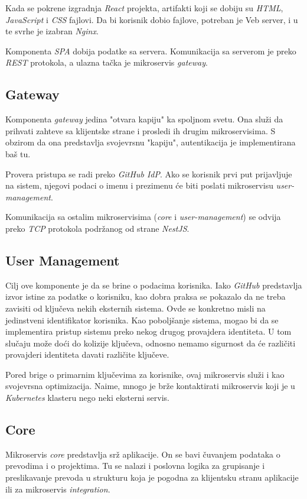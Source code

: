Kada se pokrene izgradnja \textit{React} projekta, artifakti koji se dobiju 
su \textit{HTML}, \textit{JavaScript} i \textit{CSS} fajlovi. Da bi korisnik dobio fajlove, 
potreban je Veb server, i u te svrhe je izabran \textit{Nginx}.

Komponenta \textit{SPA} dobija podatke sa servera. Komunikacija sa serverom 
je preko \textit{REST} protokola, a ulazna tačka je mikroservis \textit{gateway}.

\subsection{Gateway}
Komponenta \textit{gateway} jedina "otvara kapiju" ka spoljnom svetu.
Ona služi da prihvati zahteve sa klijentske strane i prosledi ih 
drugim mikroservisima. S obzirom da ona predstavlja svojevrsnu "kapiju",
autentikacija je implementirana baš tu.

Provera pristupa se radi preko \textit{GitHub IdP}. Ako se korisnik 
prvi put prijavljuje na sistem, njegovi podaci o imenu i prezimenu će 
biti poslati mikroservisu \textit{user-management}. 

Komunikacija sa ostalim mikroservisima (\textit{core} i \textit{user-management})
se odvija preko \textit{TCP} protokola podržanog od strane \textit{NestJS}.

\subsection{User Management}
Cilj ove komponente je da se brine o podacima korisnika. Iako \textit{GitHub} 
predstavlja izvor istine za podatke o korisniku, kao dobra praksa se 
pokazalo da ne treba zavisiti od ključeva nekih eksternih sistema. 
Ovde se konkretno misli na jedinstveni identifikator korisnika. Kao 
poboljšanje sistema, mogao bi da se implementira pristup sistemu preko 
nekog drugog provajdera identiteta. U tom slučaju može doći do kolizije 
ključeva, odnosno nemamo sigurnost da će različiti provajderi identiteta 
davati različite ključeve.

Pored brige o primarnim ključevima za korisnike, ovaj mikroservis služi 
i kao svojevrsna optimizacija. Naime, mnogo je brže kontaktirati 
mikroservis koji je u \textit{Kubernetes} klasteru nego neki eksterni 
servis.

\subsection{Core}
Mikroservis \textit{core} predstavlja srž aplikacije. On se bavi čuvanjem 
podataka o prevodima i o projektima. Tu se nalazi i poslovna logika za 
grupisanje i preslikavanje prevoda u strukturu koja je pogodna za 
klijentsku stranu aplikacije ili za mikroservis \textit{integration}.

